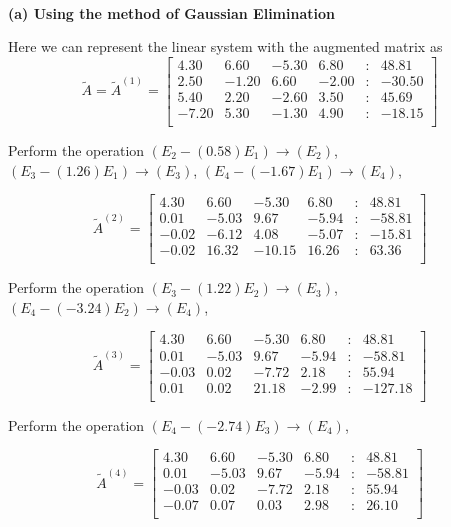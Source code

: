 \begin{solution}\ \\

\textbf{(a) Using the method of Gaussian Elimination}


Here we can represent the linear system with the augmented matrix as
$$ 
\tilde A=\tilde A^{(1)}=
 \begin{bmatrix} 
    4.30 &     6.60 &    -5.30 &     6.80 & : &    48.81 \\ 
    2.50 &    -1.20 &     6.60 &    -2.00 & : &   -30.50 \\ 
    5.40 &     2.20 &    -2.60 &     3.50 & : &    45.69 \\ 
   -7.20 &     5.30 &    -1.30 &     4.90 & : &   -18.15 \\ 
\end{bmatrix} 
$$ 

Perform the operation 
 $ ( E_{2} - (0.58) E_{1}) \rightarrow (E_{2}) $,  $ ( E_{3} - (1.26) E_{1}) \rightarrow (E_{3}) $,  $ ( E_{4} - (-1.67) E_{1}) \rightarrow (E_{4}) $, 
 
$$ 
\tilde A^{(2)}=
 \begin{bmatrix} 
    4.30 &     6.60 &    -5.30 &     6.80 & : &    48.81 \\ 
    0.01 &    -5.03 &     9.67 &    -5.94 & : &   -58.81 \\ 
   -0.02 &    -6.12 &     4.08 &    -5.07 & : &   -15.81 \\ 
   -0.02 &    16.32 &   -10.15 &    16.26 & : &    63.36 \\ 
\end{bmatrix} 
 $$ 

 
Perform the operation 
 $ ( E_{3} - (1.22) E_{2}) \rightarrow (E_{3}) $,  $ ( E_{4} - (-3.24) E_{2}) \rightarrow (E_{4}) $, 
 
$$ 
 \tilde A^{(3)}=
 \begin{bmatrix} 
    4.30 &     6.60 &    -5.30 &     6.80 & : &    48.81 \\ 
    0.01 &    -5.03 &     9.67 &    -5.94 & : &   -58.81 \\ 
   -0.03 &     0.02 &    -7.72 &     2.18 & : &    55.94 \\ 
    0.01 &     0.02 &    21.18 &    -2.99 & : &  -127.18 \\ 
\end{bmatrix} 
 $$ 

 
Perform the operation 
 $ ( E_{4} - (-2.74) E_{3}) \rightarrow (E_{4}) $, 
 
$$ 
 \tilde A^{(4)}=
 \begin{bmatrix} 
    4.30 &     6.60 &    -5.30 &     6.80 & : &    48.81 \\ 
    0.01 &    -5.03 &     9.67 &    -5.94 & : &   -58.81 \\ 
   -0.03 &     0.02 &    -7.72 &     2.18 & : &    55.94 \\ 
   -0.07 &     0.07 &     0.03 &     2.98 & : &    26.10 \\ 
\end{bmatrix} 
 $$ 


\end{solution}
